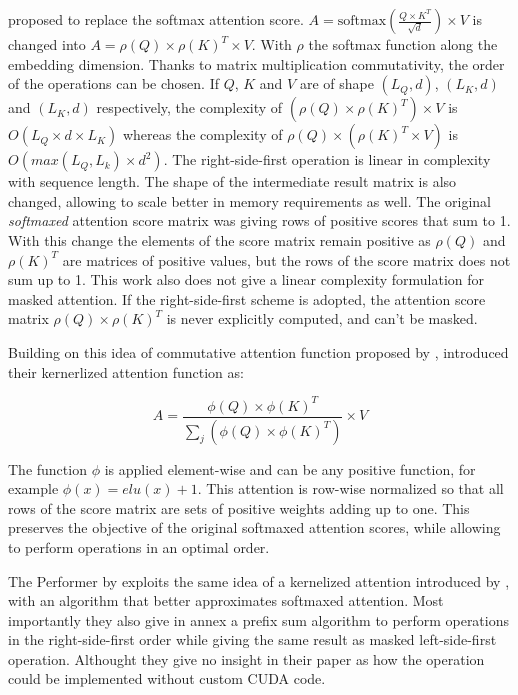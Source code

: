 \citet{shen2020efficient} proposed to
 replace the softmax attention score.
 $A = \mathrm{softmax}\left(\frac{Q \times K^T}{\sqrt{d}}\right) \times V$ is
changed into $A = \rho(Q) \times \rho(K)^T \times V$. With $\rho$
the softmax function along the embedding dimension. Thanks to matrix
multiplication commutativity, the order of the operations can be chosen.
If $Q$, $K$ and $V$ are of shape $(L_Q, d)$, $(L_K, d)$ and
$(L_K, d)$ respectively, the complexity of
$(\rho(Q) \times \rho(K)^T) \times V$ is $O(L_Q \times d \times L_K)$ whereas the complexity of
$\rho(Q) \times (\rho(K)^T \times V)$ is
$O\left(max(L_Q, L_k) \times d^2 \right)$. The right-side-first
operation is linear in complexity with sequence length. The shape of the
intermediate result matrix is also changed, allowing to scale better
in memory requirements as well. The original \emph{softmaxed} attention score
matrix was giving rows of positive scores that sum to 1. With this
change the elements of the score matrix remain positive as $\rho(Q)$
and $\rho(K)^T$ are matrices of positive values, but the rows of the score matrix does not sum up to 1. This work also does not give a linear complexity formulation for masked attention. If the right-side-first
scheme is adopted, the attention score matrix
$\rho(Q) \times \rho(K)^T$ is never explicitly computed, and can't be
masked.

Building on this idea of commutative attention function proposed by
\citep{shen2020efficient}, \citet{katharopoulos2020transformers} introduced their kernerlized attention function as:

\begin{equation}
A = \frac{\phi(Q) \times \phi(K)^T}{\sum_j \left( \phi(Q) \times \phi(K)^T \right)} \times V
\end{equation}

The function $\phi$ is applied element-wise and can be any positive
function, for example $\phi(x) = elu(x) + 1$. This attention is
row-wise normalized so that all rows of the score matrix are sets of
positive weights adding up to one. This preserves the objective of the
original softmaxed attention scores, while allowing to perform
operations in an optimal order.

The Performer by \citet{choromanski2021rethinking} exploits the same idea of a kernelized attention introduced
by \citet{katharopoulos2020transformers}, with an algorithm that better approximates softmaxed attention. Most
importantly they also give in annex a prefix sum algorithm to perform operations in the right-side-first order while giving the same result as masked left-side-first operation. Althought they give no insight in their paper as how the operation could be implemented without custom CUDA code.


